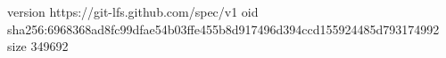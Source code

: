 version https://git-lfs.github.com/spec/v1
oid sha256:6968368ad8fc99dfae54b03ffe455b8d917496d394ccd155924485d793174992
size 349692
